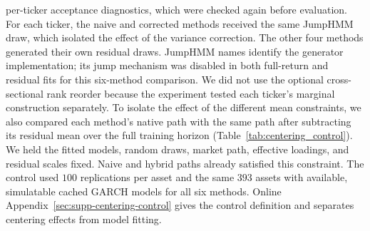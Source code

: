per-ticker acceptance diagnostics, which were checked again before
evaluation.
For each ticker, the naive and corrected methods received the same
JumpHMM draw, which isolated the effect of the variance correction. The
other four methods generated their own residual draws. JumpHMM names
identify the generator implementation; its jump mechanism was disabled
in both full-return and residual fits for this six-method comparison.
We did not use the optional cross-sectional rank reorder because the
experiment tested each ticker's marginal construction separately.
To isolate the effect of the different mean constraints, we also
compared each method's native path with the same path after subtracting
its residual mean over the full training horizon
(Table~\ref{tab:centering_control}). We held the fitted models,
random draws, market path, effective loadings, and residual scales
fixed. Naive and hybrid paths already satisfied this constraint.
The control used $100$ replications per asset and the same $393$
assets with available, simulatable cached GARCH models for all six
methods. Online Appendix~\ref{sec:supp-centering-control} gives the
control definition and separates centering effects from model fitting.

